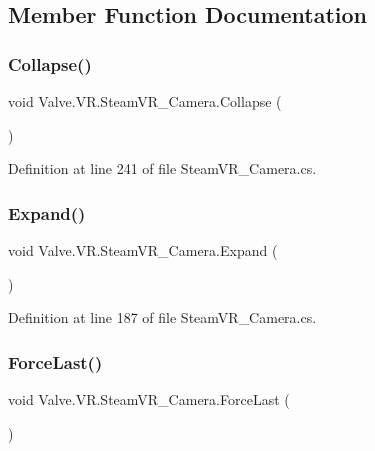 \subsection{Member Function Documentation}
\mbox{\label{class_valve_1_1_v_r_1_1_steam_v_r___camera_a60ba8f4bceae007fb9f41702669346c1}} 
\subsubsection{\texorpdfstring{Collapse()}{Collapse()}}
{\footnotesize\ttfamily void Valve.\+V\+R.\+Steam\+V\+R\+\_\+\+Camera.\+Collapse (\begin{DoxyParamCaption}{ }\end{DoxyParamCaption})}



Definition at line 241 of file Steam\+V\+R\+\_\+\+Camera.\+cs.

\mbox{\label{class_valve_1_1_v_r_1_1_steam_v_r___camera_a51e94885e2b2c73ec9da4716f8de0bc5}} 
\subsubsection{\texorpdfstring{Expand()}{Expand()}}
{\footnotesize\ttfamily void Valve.\+V\+R.\+Steam\+V\+R\+\_\+\+Camera.\+Expand (\begin{DoxyParamCaption}{ }\end{DoxyParamCaption})}



Definition at line 187 of file Steam\+V\+R\+\_\+\+Camera.\+cs.

\mbox{\label{class_valve_1_1_v_r_1_1_steam_v_r___camera_ae7382a4a9bdc196f3fdba43bf4801083}} 
\subsubsection{\texorpdfstring{ForceLast()}{ForceLast()}}
{\footnotesize\ttfamily void Valve.\+V\+R.\+Steam\+V\+R\+\_\+\+Camera.\+Force\+Last (\begin{DoxyParamCaption}{ }\end{DoxyParamCaption})}



